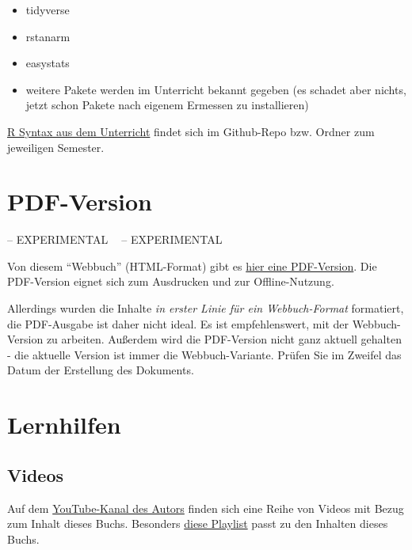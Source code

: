 \documentclass[
  a4paper,
  DIV=11]{scrreprt}
\providecommand{\tightlist}{%
  \setlength{\itemsep}{0pt}\setlength{\parskip}{0pt}}\usepackage{longtable,booktabs,array}
\theoremstyle{definition}
\theoremstyle{remark}
\begin{document}
\begin{itemize}
\tightlist
\item
  tidyverse
\item
  rstanarm
\item
  easystats
\item
  weitere Pakete werden im Unterricht bekannt gegeben (es schadet aber
  nichts, jetzt schon Pakete nach eigenem Ermessen zu installieren)
\end{itemize}

\href{https://github.com/sebastiansauer/Lehre}{R Syntax aus dem
Unterricht} findet sich im Github-Repo bzw. Ordner zum jeweiligen
Semester.

\hypertarget{pdf-version}{%
\section*{PDF-Version}\label{pdf-version}}


-- EXPERIMENTAL 🔬🧪 -- EXPERIMENTAL

Von diesem ``Webbuch'' (HTML-Format) gibt es
\href{Start-Bayes!.pdf}{hier eine PDF-Version}. Die PDF-Version eignet
sich zum Ausdrucken und zur Offline-Nutzung.

Allerdings wurden die Inhalte \emph{in erster Linie für ein
Webbuch-Format} formatiert, die PDF-Ausgabe ist daher nicht ideal. Es
ist empfehlenswert, mit der Webbuch-Version zu arbeiten. Außerdem wird
die PDF-Version nicht ganz aktuell gehalten - die aktuelle Version ist
immer die Webbuch-Variante. Prüfen Sie im Zweifel das Datum der
Erstellung des Dokuments.

\hypertarget{lernhilfen}{%
\section*{Lernhilfen}\label{lernhilfen}}


\hypertarget{videos}{%
\subsection*{Videos}\label{videos}}

Auf dem
\href{https://www.youtube.com/channel/UCkvdtj8maE7g-SOCh4aDB9g}{YouTube-Kanal
des Autors} finden sich eine Reihe von Videos mit Bezug zum Inhalt
dieses Buchs. Besonders
\href{https://www.youtube.com/playlist?list=PLRR4REmBgpIGVptiSN-qDVEJKfFnUqDyL}{diese
Playlist} passt zu den Inhalten dieses Buchs.
\end{document}
